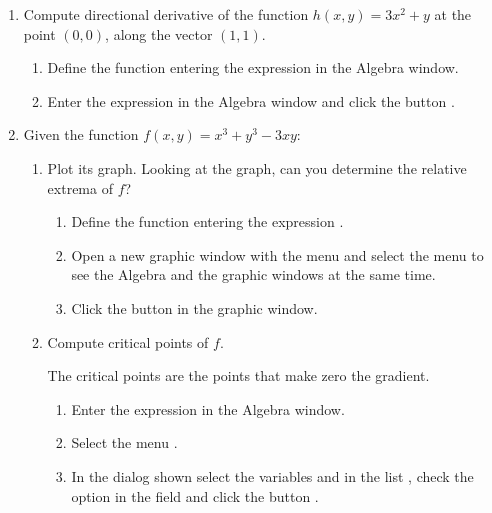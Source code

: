 \begin{enumerate}[leftmargin=*]
% 
\item Compute directional derivative of the function $h(x,y)= 3x^2+y$ at the point $(0,0)$, along the vector $(1,1)$.
\begin{indication}
\begin{enumerate}
\item Define the function entering the expression  in the Algebra window.
\item Enter the expression  in the Algebra window and click the button .
\end{enumerate}
\end{indication}

\item Given the function $f(x,y)=x^3+y^3-3xy$:
\begin{enumerate}
\item Plot its graph. 
Looking at the graph, can you determine the relative extrema of $f$?
\begin{indication}
\begin{enumerate}
\item Define the function entering the expression .
\item Open a new graphic window with the menu  and select the menu  to see the Algebra and the graphic windows at the same time.
\item Click the button  in the graphic window.
\end{enumerate}
\end{indication}

\item Compute critical points of $f$.
\begin{indication}
The critical points are the points that make zero the gradient. 
\begin{enumerate}
\item Enter the expression  in the Algebra window.
\item Select the menu .
\item In the dialog shown select the variables  and  in the list , check the option  in the field  and click the button .
\end{enumerate}
\end{indication}


\end{enumerate}
\end{enumerate}
